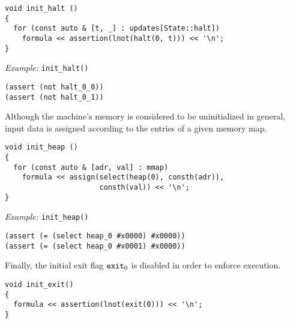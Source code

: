 \begin{lstlisting}[style=c++]
void init_halt ()
{
  for (const auto & [t, _] : updates[State::halt])
    formula << assertion(lnot(halt(0, t))) << '\n';
}
\end{lstlisting}

\noindent
\emph{Example:} \lstinline[style=c++]{init_halt()}

\begin{lstlisting}[language=SMTLib]
(assert (not halt_0_0))
(assert (not halt_0_1))
\end{lstlisting}


\noindent
Although the machine's memory is considered to be uninitialized in general, input data is assigned according to the entries of a given memory map.

\begin{lstlisting}[style=c++]
void init_heap ()
{
  for (const auto & [adr, val] : mmap)
    formula << assign(select(heap(0), consth(adr)),
                      consth(val)) << '\n';
}
\end{lstlisting}

\noindent
\emph{Example:} \lstinline[style=c++]{init_heap()}

\begin{lstlisting}[language=SMTLib]
(assert (= (select heap_0 #x0000) #x0000))
(assert (= (select heap_0 #x0001) #x0000))
\end{lstlisting}


\noindent
Finally, the initial exit flag $\texttt{exit}_0$ is disabled in order to enforce execution.

\begin{lstlisting}[style=c++]
void init_exit()
{
  formula << assertion(lnot(exit(0))) << '\n';
}
\end{lstlisting}

